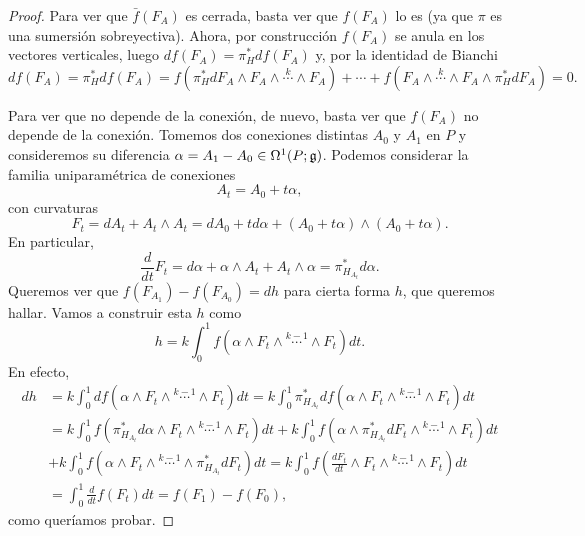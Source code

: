 \documentclass[11pt,a4paper]{amsbook}
\theoremstyle{remark} \newtheorem{rmk}[subsection]{Observación}
\theoremstyle{definition} \newtheorem{defn}[subsection]{Definición}
\theoremstyle{definition} \newtheorem{ex}[subsection]{Ejemplo}
\theoremstyle{definition} \newtheorem{ej}[subsection]{Ejercicio}
\begin{document}
\begin{proof}
Para ver que $\bar{f}(F_A)$ es cerrada, basta ver que $f(F_A)$ lo es (ya que $\pi$ es una sumersión sobreyectiva). Ahora, por construcción $f(F_A)$ se anula en los vectores verticales, luego $df(F_A)=\pi_H^* df(F_A)$ y, por la identidad de Bianchi
\begin{equation*}
 df(F_A)=\pi_H^* df(F_A) = f(\pi_H^* d F_A \wedge F_A \wedge \overset{k}{\cdots} \wedge F_A) + \cdots + f( F_A \wedge \overset{k}{\cdots} \wedge F_A \wedge \pi_H^* dF_A) = 0.
\end{equation*}

Para ver que no depende de la conexión, de nuevo, basta ver que $f(F_A)$ no depende de la conexión. Tomemos dos conexiones distintas $A_0$ y $A_1$ en $P$ y consideremos su diferencia $\alpha=A_1-A_0\in \Omega^1(P;\mathfrak{g})$. Podemos considerar la familia uniparamétrica de conexiones
\begin{equation*}
A_t = A_0 + t\alpha,
\end{equation*}
con curvaturas
\begin{equation*}
F_t = dA_t + A_t \wedge A_t = dA_0 + td\alpha + (A_0 + t\alpha) \wedge (A_0+t\alpha).
\end{equation*}
En particular,
\begin{equation*}
\frac{d}{dt} F_t = d\alpha + \alpha \wedge A_t + A_t \wedge \alpha = \pi_{H_{A_t}}^* d\alpha.
\end{equation*}
Queremos ver que $f(F_{A_1})-f(F_{A_0})=dh$ para cierta forma $h$, que queremos hallar. Vamos a construir esta $h$ como
\begin{equation*}
h = k \int_0^1 f(\alpha \wedge F_t \wedge \overset{k-1}{\cdots} \wedge F_t) dt.
\end{equation*}
En efecto,
\begin{align*}
dh &= k \int_0^1 df(\alpha \wedge F_t \wedge \overset{k-1}{\cdots} \wedge F_t) dt = k \int_0^1 \pi_{H_{A_t}}^* df(\alpha \wedge F_t \wedge \overset{k-1}{\cdots} \wedge F_t) dt  \\
&= k \int_0^1 f(\pi_{H_{A_t}}^*d\alpha \wedge F_t \wedge \overset{k-1}{\cdots} \wedge F_t) dt + k \int_0^1 f(\alpha \wedge \pi_{H_{A_t}}^* dF_t \wedge \overset{k-1}{\cdots} \wedge F_t) dt \\
& +k \int_0^1 f(\alpha \wedge F_t \wedge \overset{k-1}{\cdots} \wedge \pi_{H_{A_t}}^*dF_t) dt = k \int_0^1 f\left(\frac{dF_t}{dt} \wedge F_t \wedge \overset{k-1}{\cdots} \wedge F_t\right) dt  \\
  &= \int_0^1 \frac{d}{dt} f(F_t) dt = f(F_1) - f(F_0),
\end{align*}
como queríamos probar.
\end{proof}
\end{document}
